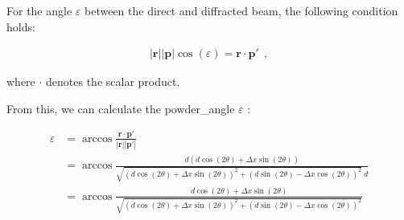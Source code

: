 \documentclass[a4paper, 12pt, twoside]{scrartcl}
\begin{document}
For the angle $ \varepsilon $ between the direct and diffracted beam, the following condition holds:

\begin{align*}
	|\boldsymbol{r}| |\boldsymbol{p}| \cos(\varepsilon) = \boldsymbol{r} \cdot \boldsymbol{p'}~~\mathrm{,}
\end{align*}

where $ \cdot $ denotes the scalar product.

From this, we can calculate the powder\_angle $ \varepsilon $ :

\begin{align*}
	\varepsilon &= \arccos \frac{\boldsymbol{r} \cdot \boldsymbol{p'}}{|\boldsymbol{r}||\boldsymbol{p'}|} \\
	&= \arccos \frac{d ( d\cos(2\theta) + \Delta x \sin(2\theta))}{\sqrt{(d\cos(2\theta) + \Delta x \sin(2\theta))^2 + (d\sin(2\theta) - \Delta x \cos(2\theta))^2}~d} \\
	&= \arccos \frac{d\cos(2\theta) + \Delta x \sin(2\theta)}{\sqrt{(d\cos(2\theta) + \Delta x \sin(2\theta))^2 + (d\sin(2\theta) - \Delta x \cos(2\theta))^2}}
\end{align*}
\end{document}
